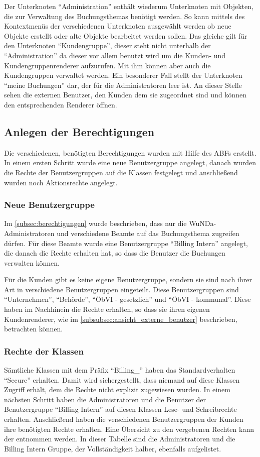 Der Unterknoten "`Administration"' enthält wiederum Unterknoten mit Objekten, die zur Verwaltung des Buchungsthemas benötigt werden.
So kann mittels des Kontextmenüs der verschiedenen Unterknoten ausgewählt werden ob neue Objekte erstellt oder alte Objekte bearbeitet werden sollen.
Das gleiche gilt für den Unterknoten "`Kundengruppe"', dieser steht nicht unterhalb der "`Administration"' da dieser vor allem benutzt wird um die Kunden- und Kundengruppenrenderer aufzurufen. Mit ihm können aber auch die Kundengruppen verwaltet werden.
Ein besonderer Fall stellt der Unterknoten "`meine Buchungen"' dar, der für die Administratoren leer ist.
An dieser Stelle sehen die externen Benutzer, den Kunden dem sie zugeordnet sind und können den entsprechenden Renderer öffnen. 

\subsection{Anlegen der Berechtigungen}

Die verschiedenen, benötigten Berechtigungen wurden mit Hilfe des \ac{ABF}s erstellt.
In einem ersten Schritt wurde eine neue Benutzergruppe angelegt, danach wurden die Rechte der Benutzergruppen auf die Klassen festgelegt und anschließend wurden noch Aktionsrechte angelegt. 

\subsubsection{Neue Benutzergruppe}
Im \autoref{subsec:berechtigungen} wurde beschrieben, dass nur die \ac{WuNDa}-Administratoren und verschiedene Beamte auf das Buchungsthema zugreifen dürfen.
Für diese Beamte wurde eine Benutzergruppe "`Billing Intern"' angelegt, die danach die Rechte erhalten hat, so dass die Benutzer die Buchungen verwalten können.

Für die Kunden gibt es keine eigene Benutzergruppe, sondern sie sind nach ihrer Art in verschiedene Benutzergruppen eingeteilt.
Diese Benutzergruppen sind "`Unternehmen"', "`Behörde"', "`ÖbVI - gesetzlich"' und "`ÖbVI - kommunal"'.
Diese haben im Nachhinein die Rechte erhalten, so dass sie ihren eigenen Kundenrenderer, wie im \autoref{subsubsec:ansicht_externe_benutzer} beschrieben, betrachten können.

\subsubsection{Rechte der Klassen}
Sämtliche Klassen mit dem Präfix "`Billing\_"' haben das Standardverhalten "`Secure"' erhalten. Damit wird sichergestellt, dass niemand auf diese Klassen Zugriff erhält, dem die Rechte nicht explizit zugewiesen wurden.
In einem nächsten Schritt haben die Administratoren und die Benutzer der Benutzergruppe "`Billing Intern"' auf diesen Klassen Lese- und Schreibrechte erhalten.
Anschließend haben die verschiedenen Benutzergruppen der Kunden ihre benötigten Rechte erhalten.
Eine Übersicht zu den vergebenen Rechten kann der  entnommen werden.
In dieser Tabelle sind die Administratoren und die Billing Intern Gruppe, der Vollständigkeit halber, ebenfalls aufgelistet.

